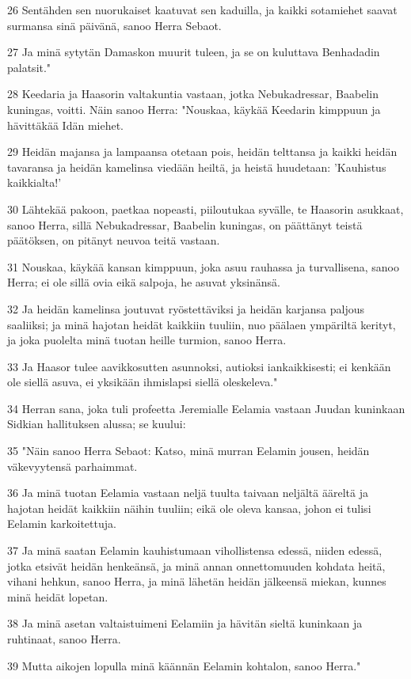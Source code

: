 \par 26 Sentähden sen nuorukaiset kaatuvat sen kaduilla, ja kaikki sotamiehet saavat surmansa sinä päivänä, sanoo Herra Sebaot.
\par 27 Ja minä sytytän Damaskon muurit tuleen, ja se on kuluttava Benhadadin palatsit."
\par 28 Keedaria ja Haasorin valtakuntia vastaan, jotka Nebukadressar, Baabelin kuningas, voitti. Näin sanoo Herra: "Nouskaa, käykää Keedarin kimppuun ja hävittäkää Idän miehet.
\par 29 Heidän majansa ja lampaansa otetaan pois, heidän telttansa ja kaikki heidän tavaransa ja heidän kamelinsa viedään heiltä, ja heistä huudetaan: 'Kauhistus kaikkialta!'
\par 30 Lähtekää pakoon, paetkaa nopeasti, piiloutukaa syvälle, te Haasorin asukkaat, sanoo Herra, sillä Nebukadressar, Baabelin kuningas, on päättänyt teistä päätöksen, on pitänyt neuvoa teitä vastaan.
\par 31 Nouskaa, käykää kansan kimppuun, joka asuu rauhassa ja turvallisena, sanoo Herra; ei ole sillä ovia eikä salpoja, he asuvat yksinänsä.
\par 32 Ja heidän kamelinsa joutuvat ryöstettäviksi ja heidän karjansa paljous saaliiksi; ja minä hajotan heidät kaikkiin tuuliin, nuo päälaen ympäriltä kerityt, ja joka puolelta minä tuotan heille turmion, sanoo Herra.
\par 33 Ja Haasor tulee aavikkosutten asunnoksi, autioksi iankaikkisesti; ei kenkään ole siellä asuva, ei yksikään ihmislapsi siellä oleskeleva."
\par 34 Herran sana, joka tuli profeetta Jeremialle Eelamia vastaan Juudan kuninkaan Sidkian hallituksen alussa; se kuului:
\par 35 "Näin sanoo Herra Sebaot: Katso, minä murran Eelamin jousen, heidän väkevyytensä parhaimmat.
\par 36 Ja minä tuotan Eelamia vastaan neljä tuulta taivaan neljältä ääreltä ja hajotan heidät kaikkiin näihin tuuliin; eikä ole oleva kansaa, johon ei tulisi Eelamin karkoitettuja.
\par 37 Ja minä saatan Eelamin kauhistumaan vihollistensa edessä, niiden edessä, jotka etsivät heidän henkeänsä, ja minä annan onnettomuuden kohdata heitä, vihani hehkun, sanoo Herra, ja minä lähetän heidän jälkeensä miekan, kunnes minä heidät lopetan.
\par 38 Ja minä asetan valtaistuimeni Eelamiin ja hävitän sieltä kuninkaan ja ruhtinaat, sanoo Herra.
\par 39 Mutta aikojen lopulla minä käännän Eelamin kohtalon, sanoo Herra."

